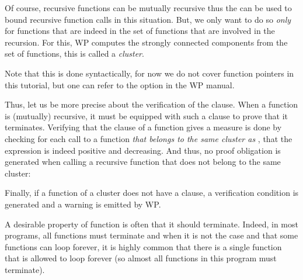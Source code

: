 Of course, recursive functions can be mutually recursive thus the
 can be used to bound recursive function calls in this
situation. But, we only want to do so {\em only} for functions that are indeed
in the set of functions that are involved in the recursion. For this, WP
computes the strongly connected components from the set of functions, this is
called a {\em cluster}.


\begin{Information}
  Note that this is done syntactically, for now we do not cover function
  pointers in this tutorial, but one can refer to the option
   in the WP manual.
\end{Information}


Thus, let us be more precise about the verification of the 
clause. When a function is (mutually) recursive, it must be equipped with such
a clause to prove that it terminates. Verifying that the 
clause of a function  gives a measure is done by checking for each
call to a function {\em that belongs to the same cluster as },
that the expression is indeed positive and decreasing. And thus, no proof
obligation is generated when calling a recursive function that does not belong
to the same cluster:






Finally, if a function of a cluster does not have a 
clause, a  verification condition is generated
and a warning is emitted by WP.









A desirable property of function is often that it should terminate. Indeed, in
most programs, all functions must terminate and when it is not the case and that
some functions can loop forever, it is highly common that there is a single
function that is allowed to loop forever (so almost all functions in this
program must terminate).






